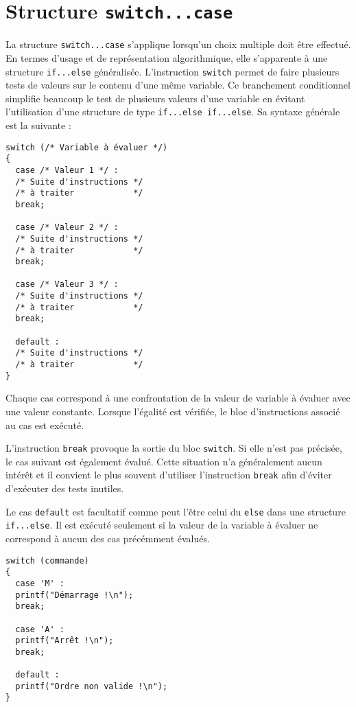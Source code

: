 \documentclass[DIV=calc,paper=a4,fontsize=11pt,twocolumn,halfparskip,parindent]{scrartcl} %
\begin{document}
\section*{Structure \texttt\textbf{switch...case}}
La structure \texttt{switch...case} s'applique lorsqu'un choix multiple doit être effectué. En termes d'usage et de représentation algorithmique, elle s'apparente à
une structure \texttt{if...else} généralisée. L'instruction \texttt{switch} permet de faire plusieurs tests de valeurs sur le contenu d'une même variable. Ce branchement
conditionnel simplifie beaucoup le test de plusieurs valeurs d'une variable en évitant l’utilisation d'une structure de type \texttt{if...else if...else}. Sa syntaxe
générale est la suivante : 
\begin{lstlisting}[frame=single]
switch (/* Variable à évaluer */)
{
  case /* Valeur 1 */ :
  /* Suite d'instructions */
  /* à traiter            */
  break;

  case /* Valeur 2 */ :
  /* Suite d'instructions */
  /* à traiter            */
  break;

  case /* Valeur 3 */ :
  /* Suite d'instructions */
  /* à traiter            */
  break;

  default :
  /* Suite d'instructions */
  /* à traiter            */
}	
\end{lstlisting}

Chaque cas correspond à une confrontation de la valeur de variable à évaluer avec une valeur constante. Lorsque l'égalité est vérifiée, le bloc d'instructions
associé au cas est exécuté.

L'instruction \texttt{break} provoque la sortie du bloc \texttt{switch}. Si elle n'est pas précisée, le cas suivant est également évalué. Cette situation n'a généralement
aucun intérêt et il convient le plus souvent d'utiliser l'instruction \texttt{break} afin d'éviter d'exécuter des tests inutiles.

Le cas \texttt{default} est facultatif comme peut l'être celui du \texttt{else} dans une structure \texttt{if...else}. Il est exécuté seulement si la valeur de la
variable à évaluer ne correspond à aucun des cas précémment évalués. 
\begin{lstlisting}[frame=single]
switch (commande)
{
  case 'M' :
  printf("Démarrage !\n");
  break;

  case 'A' :
  printf("Arrêt !\n");
  break;

  default :
  printf("Ordre non valide !\n");
}	
\end{lstlisting}
\end{document}
